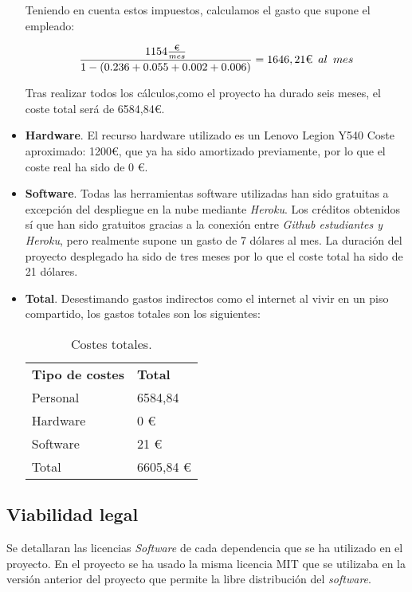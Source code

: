 \begin{itemize}
Teniendo en cuenta estos impuestos, calculamos el gasto que supone el empleado:

$$\frac{1154\frac{\text{€}}{mes}}{1-(0.236+0.055+0.002+0.006)}=1646,21\text{€}\hspace{0.5em}al\hspace{0.5em}mes$$

Tras realizar todos los cálculos,como el proyecto ha durado seis meses, el coste total será de 6584,84€.

\item \textbf{Hardware}.
El recurso hardware utilizado es un Lenovo Legion Y540 Coste aproximado: 1200€, que ya ha sido amortizado previamente, por lo que el coste real ha sido de 0 €.
 
\item \textbf{Software}.
Todas las herramientas software utilizadas han sido gratuitas a excepción del despliegue en la nube mediante \emph{Heroku}. Los créditos obtenidos sí que han sido gratuitos gracias a la conexión entre \emph{Github estudiantes y Heroku}, pero realmente supone un gasto de 7 dólares al mes.
La duración del proyecto desplegado ha sido de tres meses por lo que el coste total ha sido de 21 dólares.

 
\item \textbf{Total}.
Desestimando gastos indirectos como el internet al vivir en un piso compartido, los gastos totales son los siguientes:

\begin{table}[]
	\label{Costes totales}
	\centering
	\begin{tabular}{|l|l|}
		\hline
		\multicolumn{1}{|c|}{\textbf{Tipo de costes}}     & \textbf{Total} \\
		Personal &  6584,84\\ 
		Hardware & 0 € \\
		Software & 21 € \\	\hline
		Total & 6605,84 € \\\hline
	\end{tabular}
	\caption{Costes totales.}
\end{table}

\end{itemize}

\subsection{Viabilidad legal}
Se detallaran las licencias \emph{Software} de cada dependencia que se ha utilizado en el proyecto. En el proyecto se ha usado la misma licencia MIT que se utilizaba en la versión anterior del proyecto que permite la libre distribución del \emph{software}.

